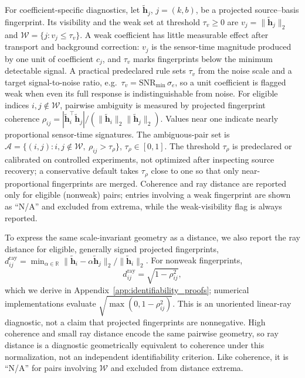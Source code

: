 For coefficient-specific diagnostics, let \(\widetilde{\mathbf h}_j\),
\(j=(k,b)\), be a projected source--basis fingerprint.  Its visibility and the
weak set at threshold \(\tau_v\ge0\) are
\(v_j=\|\widetilde{\mathbf h}_j\|_2\) and
\(\mathcal W=\{j:v_j\le\tau_v\}\).
A weak coefficient has little measurable effect after transport and background
correction: \(v_j\) is the sensor-time magnitude produced by one unit of
coefficient \(c_j\), and \(\tau_v\) marks fingerprints below the minimum
detectable signal.  A practical predeclared rule sets \(\tau_v\) from the noise
scale and a target signal-to-noise ratio, e.g.\ \(\tau_v=\mathrm{SNR}_{\min}\,
\sigma_e\), so a unit coefficient is flagged weak when even its full response is
indistinguishable from noise.  For eligible indices \(i,j\notin\mathcal W\),
pairwise ambiguity is measured by projected fingerprint coherence
\(\rho_{ij}=|\widetilde{\mathbf h}_i^\top\widetilde{\mathbf h}_j|/
(\|\widetilde{\mathbf h}_i\|_2\|\widetilde{\mathbf h}_j\|_2)\).
Values near one indicate nearly proportional sensor-time signatures.  The
ambiguous-pair set is
\(\mathcal A=\{(i,j):i,j\notin\mathcal W,\ \rho_{ij}>\tau_\rho\}\),
\(\tau_\rho\in[0,1]\).  The threshold \(\tau_\rho\) is predeclared or calibrated
on controlled experiments, not optimized after inspecting source recovery; a
conservative default takes \(\tau_\rho\) close to one so that only
near-proportional fingerprints are merged.  Coherence and ray distance are
reported only for eligible (nonweak) pairs; entries involving a weak fingerprint
are shown as ``N/A'' and excluded from extrema, while the weak-visibility flag
is always reported.

To express the same scale-invariant geometry as a distance, we also report the
ray distance for eligible, generally signed projected fingerprints,
\(d^{\mathrm{ray}}_{ij}
=\min_{\alpha\in\mathbb R}
\|\widetilde{\mathbf h}_i-\alpha\widetilde{\mathbf h}_j\|_2/
\|\widetilde{\mathbf h}_i\|_2\).
For nonweak fingerprints,
\begin{equation}
d^{\mathrm{ray}}_{ij}=\sqrt{1-\rho_{ij}^2},
\label{eq:ray_distance_coherence_relation}
\end{equation}
which we derive in Appendix~\ref{app:identifiability_proofs}; numerical
implementations evaluate \(\sqrt{\max(0,1-\rho_{ij}^2)}\).  This is an unoriented
linear-ray diagnostic, not a claim that projected fingerprints are nonnegative.
High coherence and small ray distance encode the same pairwise geometry, so ray
distance is a diagnostic geometrically equivalent to coherence under this
normalization, not an independent identifiability criterion.  Like coherence, it
is ``N/A'' for pairs involving \(\mathcal W\) and excluded from distance extrema.

